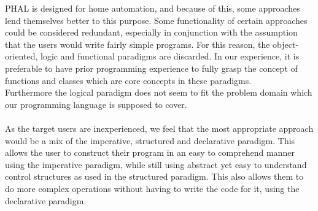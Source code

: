 PHAL is designed for home automation, and because of this, some approaches lend themselves better to this purpose. 
Some functionality of certain approaches could be considered redundant, especially in conjunction with the assumption that the users would write fairly simple programs. 
For this reason, the object-oriented, logic and functional paradigms are discarded. 
In our experience, it is preferable to have prior programming experience to fully grasp the concept of functions and classes which are core concepts in these paradigms. 
\\
Furthermore the logical paradigm does not seem to fit the problem domain which our programming language is supposed to cover. 
\\\\
As the target users are inexperienced, we feel that the most appropriate approach would be a mix of the imperative, structured and declarative paradigm. 
This allows the user to construct their program in an easy to comprehend manner using the imperative paradigm, while still using abstract yet easy to understand control structures as used in the structured paradigm. 
This also allows them to do more complex operations without having to write the code for it, using the declarative paradigm.

